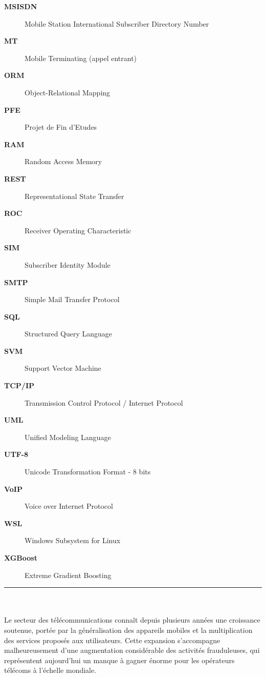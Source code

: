 \documentclass[12pt, oneside, a4paper]{report}
\begin{document}
\begin{description}
\item[\textbf{MSISDN}] Mobile Station International Subscriber Directory Number
\item[\textbf{MT}] Mobile Terminating (appel entrant)
\item[\textbf{ORM}] Object-Relational Mapping
\item[\textbf{PFE}] Projet de Fin d'Etudes
\item[\textbf{RAM}] Random Access Memory
\item[\textbf{REST}] Representational State Transfer
\item[\textbf{ROC}] Receiver Operating Characteristic
\item[\textbf{SIM}] Subscriber Identity Module
\item[\textbf{SMTP}] Simple Mail Transfer Protocol
\item[\textbf{SQL}] Structured Query Language
\item[\textbf{SVM}] Support Vector Machine
\item[\textbf{TCP/IP}] Transmission Control Protocol / Internet Protocol
\item[\textbf{UML}] Unified Modeling Language
\item[\textbf{UTF-8}] Unicode Transformation Format - 8 bits
\item[\textbf{VoIP}] Voice over Internet Protocol
\item[\textbf{WSL}] Windows Subsystem for Linux
\item[\textbf{XGBoost}] Extreme Gradient Boosting
\end{description}
\clearpage
\thispagestyle{plain}

\noindent\rule[-0.2cm]{0.45cm}{1.2cm}\hspace{0.15cm}%
\raisebox{0.85cm}{\rule{0.85\textwidth}{0.5pt}}\\[0.3cm]
\noindent{}\\[1.0cm]

Le secteur des télécommunications connaît depuis plusieurs années une croissance soutenue, portée par la généralisation des appareils mobiles et la multiplication des services proposés aux utilisateurs. Cette expansion s'accompagne malheureusement d'une augmentation considérable des activités frauduleuses, qui représentent aujourd'hui un manque à gagner énorme pour les opérateurs télécoms à l'échelle mondiale.
\end{document}
